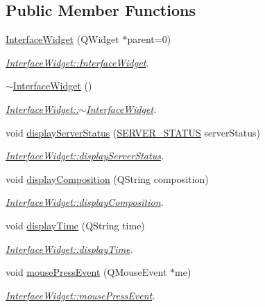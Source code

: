\subsection*{\-Public \-Member \-Functions}
\begin{DoxyCompactItemize}
\item 
\hyperlink{class_interface_widget_adddb54676e57004c5cc562d90c36d83c}{\-Interface\-Widget} (\-Q\-Widget $\ast$parent=0)
\begin{DoxyCompactList}\small\item\em \hyperlink{class_interface_widget_adddb54676e57004c5cc562d90c36d83c}{\-Interface\-Widget\-::\-Interface\-Widget}. \end{DoxyCompactList}\item 
\hyperlink{class_interface_widget_a7ac11d16b11cf435594e38b098176217}{$\sim$\-Interface\-Widget} ()
\begin{DoxyCompactList}\small\item\em \hyperlink{class_interface_widget_a7ac11d16b11cf435594e38b098176217}{\-Interface\-Widget\-::$\sim$\-Interface\-Widget}. \end{DoxyCompactList}\item 
void \hyperlink{class_interface_widget_a70f09b9d06d0f202a995b12a087a910d}{display\-Server\-Status} (\hyperlink{_interface_widget_8hpp_acf938af120b82076e10141155fe5ef9b}{\-S\-E\-R\-V\-E\-R\-\_\-\-S\-T\-A\-T\-U\-S} server\-Status)
\begin{DoxyCompactList}\small\item\em \hyperlink{class_interface_widget_a70f09b9d06d0f202a995b12a087a910d}{\-Interface\-Widget\-::display\-Server\-Status}. \end{DoxyCompactList}\item 
void \hyperlink{class_interface_widget_ac9c49591613a6ca657fae9c11d256eb1}{display\-Composition} (\-Q\-String composition)
\begin{DoxyCompactList}\small\item\em \hyperlink{class_interface_widget_ac9c49591613a6ca657fae9c11d256eb1}{\-Interface\-Widget\-::display\-Composition}. \end{DoxyCompactList}\item 
void \hyperlink{class_interface_widget_aa0286660e6d0ceb3ca19c378b44c59e1}{display\-Time} (\-Q\-String time)
\begin{DoxyCompactList}\small\item\em \hyperlink{class_interface_widget_aa0286660e6d0ceb3ca19c378b44c59e1}{\-Interface\-Widget\-::display\-Time}. \end{DoxyCompactList}\item 
void \hyperlink{class_interface_widget_a652bc298aafbacea7f64bce43b3ed0aa}{mouse\-Press\-Event} (\-Q\-Mouse\-Event $\ast$me)
\begin{DoxyCompactList}\small\item\em \hyperlink{class_interface_widget_a652bc298aafbacea7f64bce43b3ed0aa}{\-Interface\-Widget\-::mouse\-Press\-Event}. \end{DoxyCompactList}\end{DoxyCompactItemize}


